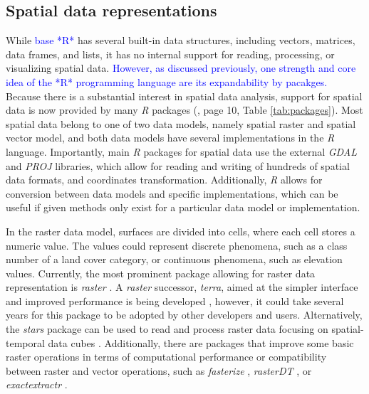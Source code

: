 \documentclass[smallextended]{svjour3}       %
\begin{document}
\hypertarget{sec:spatrep}{%
\subsection{Spatial data representations}\label{sec:spatrep}}

While \textcolor{blue}{base *R*} has several built-in data structures, including vectors, matrices, data frames, and lists, it has no internal support for reading, processing, or visualizing spatial data.
\textcolor{blue}{However, as discussed previously, one strength and core idea of the *R* programming language are its expandability by pacakges.}
Because there is a substantial interest in spatial data analysis, support for spatial data is now provided by many \emph{R} packages (\cite{Lovelace2019}, page 10, Table \ref{tab:packages}).
Most spatial data belong to one of two data models, namely spatial raster and spatial vector model, and both data models have several implementations in the \emph{R} language.
Importantly, main \emph{R} packages for spatial data use the external \emph{GDAL} \cite{GDAL/OGRcontributors2020} and \emph{PROJ} \cite{PROJcontributors2021} libraries, which allow for reading and writing of hundreds of spatial data formats, and coordinates transformation.
Additionally, \emph{R} allows for conversion between data models and specific implementations, which can be useful if given methods only exist for a particular data model or implementation.

In the raster data model, surfaces are divided into cells, where each cell stores a numeric value.
The values could represent discrete phenomena, such as a class number of a land cover category, or continuous phenomena, such as elevation values.
Currently, the most prominent package allowing for raster data representation is \emph{raster} \cite{Hijmans2019}.
A \emph{raster} successor, \emph{terra}, aimed at the simpler interface and improved performance is being developed \cite{Hijmans2021}, however, it could take several years for this package to be adopted by other developers and users.
Alternatively, the \emph{stars} package can be used to read and process raster data focusing on spatial-temporal data cubes \cite{Pebesma2019}.
Additionally, there are packages that improve some basic raster operations in terms of computational performance or compatibility between raster and vector operations, such as \emph{fasterize} \cite{Ross2020}, \emph{rasterDT} \cite{OBrien2020}, or \emph{exactextractr} \cite{Baston2020}.
\end{document}

